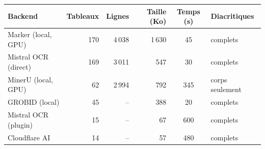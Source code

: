 \begin{tabular}{lrrrcl}
\toprule
Backend & Tableaux & Lignes & Taille (Ko) & Temps (s) & Diacritiques \\
\midrule
Marker (local, GPU) & 170 & 4\,038 & 1\,630 & 45 & complets \\
Mistral OCR (direct) & 169 & 3\,011 & 547 & 30 & complets \\
MinerU (local, GPU) & 62 & 2\,994 & 792 & 345 & corps seulement \\
GROBID (local) & 45 & -- & 388 & 20 & complets \\
Mistral OCR (plugin) & 15 & -- & 67 & 600 & complets \\
Cloudflare AI & 14 & -- & 57 & 480 & complets \\
\bottomrule
\end{tabular}
